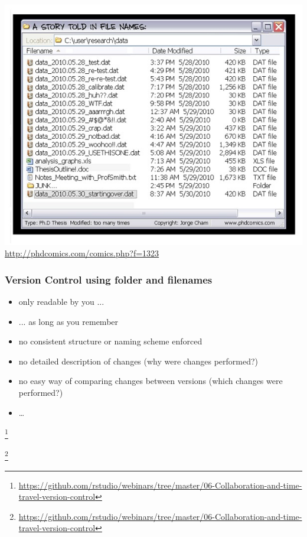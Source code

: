 \documentclass[
t, %
10pt, %
aspectratio=1610, %
ngerman,
english,
]{beamer}
\newcommand\blfootnote[1]{%
  \begingroup
  \renewcommand\thefootnote{}\footnote{#1}%
  \addtocounter{footnote}{-1}%
  \endgroup
}
\begin{document}
\begin{frame}
    \centering
    \includegraphics[height=\textheight]{graphics/phd052810s.jpg}\\
    \url{http://phdcomics.com/comics.php?f=1323}
\end{frame}

\begin{frame}
    \frametitle{Version Control using folder and filenames}
    \begin{itemize}[<+->]
        \item only readable by you ...
        \item ... as long as you remember
        \item no consistent structure or naming scheme enforced
        \item no detailed description of changes (why were changes performed?)
        \item no easy way of comparing changes between versions (which changes were performed?)
        \item \dots{}
    \end{itemize}
\end{frame}

\begin{frame}
    
    \blfootnote{\url{https://github.com/rstudio/webinars/tree/master/06-Collaboration-and-time-travel-version-control}}
\end{frame}

\begin{frame}
    
    \blfootnote{\url{https://github.com/rstudio/webinars/tree/master/06-Collaboration-and-time-travel-version-control}}
\end{frame}
\end{document}

